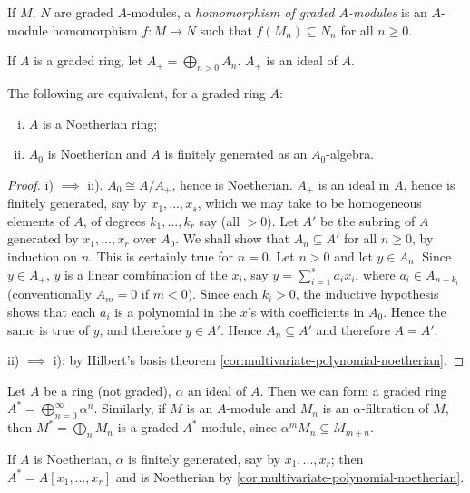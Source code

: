 If $M$, $N$ are graded $A$-modules, a \emph{homomorphism of graded $A$-modules} is an $A$-module homomorphism $f \colon M \to N$ such that $f(M_n) \subseteq N_n$ for all $n \geq 0$.

If $A$ is a graded ring, let $A_+ = \bigoplus_{n > 0} A_n$. $A_+$ is an ideal of $A$.

\begin{proposition}\label{prop:graded-noetherian}
The following are equivalent, for a graded ring $A$:
\begin{enumerate}[i)]
    \item $A$ is a Noetherian ring;
    \item $A_0$ is Noetherian and $A$ is finitely generated as an $A_0$-algebra.
\end{enumerate}
\end{proposition}

\begin{proof}
i) $\implies$ ii). $A_0 \cong A/A_+$, hence is Noetherian. $A_+$ is an ideal in $A$, hence is finitely generated, say by $x_1, \ldots, x_s$, which we may take to be homogeneous elements of $A$, of degrees $k_1, \ldots, k_r$ say (all $> 0$). Let $A'$ be the subring of $A$ generated by $x_1, \ldots, x_r$ over $A_0$. We shall show that $A_n \subseteq A'$ for all $n \geq 0$, by induction on $n$. This is certainly true for $n = 0$. Let $n > 0$ and let $y \in A_n$. Since $y \in A_+$, $y$ is a linear combination of the $x_i$, say $y = \sum_{i=1}^s a_i x_i$, where $a_i \in A_{n-k_i}$ (conventionally $A_m = 0$ if $m < 0$). Since each $k_i > 0$, the inductive hypothesis shows that each $a_i$ is a polynomial in the $x$'s with coefficients in $A_0$. Hence the same is true of $y$, and therefore $y \in A'$. Hence $A_n \subseteq A'$ and therefore $A = A'$.

ii) $\implies$ i): by Hilbert's basis theorem \eqref{cor:multivariate-polynomial-noetherian}.
\end{proof}

Let $A$ be a ring (not graded), $\alpha$ an ideal of $A$. Then we can form a graded ring $A^* = \bigoplus_{n=0}^\infty \alpha^n$. Similarly, if $M$ is an $A$-module and $M_n$ is an $\alpha$-filtration of $M$, then $M^* = \bigoplus_n M_n$ is a graded $A^*$-module, since $\alpha^m M_n \subseteq M_{m+n}$.

If $A$ is Noetherian, $\alpha$ is finitely generated, say by $x_1, \ldots, x_r$; then $A^* = A[x_1, \ldots, x_r]$ and is Noetherian by \eqref{cor:multivariate-polynomial-noetherian}.

